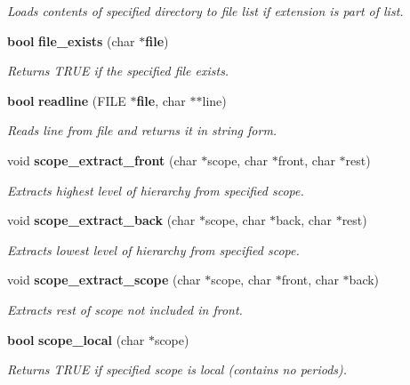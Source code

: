 \begin{CompactItemize}
\begin{CompactList}\small\item\em Loads contents of specified directory to file list if extension is part of list.\item\end{CompactList}\item 
{\bf bool} {\bf file\_\-exists} (char $\ast${\bf file})
\begin{CompactList}\small\item\em Returns TRUE if the specified file exists.\item\end{CompactList}\item 
{\bf bool} {\bf readline} (FILE $\ast${\bf file}, char $\ast$$\ast$line)
\begin{CompactList}\small\item\em Reads line from file and returns it in string form.\item\end{CompactList}\item 
void {\bf scope\_\-extract\_\-front} (char $\ast$scope, char $\ast$front, char $\ast$rest)
\begin{CompactList}\small\item\em Extracts highest level of hierarchy from specified scope.\item\end{CompactList}\item 
void {\bf scope\_\-extract\_\-back} (char $\ast$scope, char $\ast$back, char $\ast$rest)
\begin{CompactList}\small\item\em Extracts lowest level of hierarchy from specified scope.\item\end{CompactList}\item 
void {\bf scope\_\-extract\_\-scope} (char $\ast$scope, char $\ast$front, char $\ast$back)
\begin{CompactList}\small\item\em Extracts rest of scope not included in front.\item\end{CompactList}\item 
{\bf bool} {\bf scope\_\-local} (char $\ast$scope)
\begin{CompactList}\small\item\em Returns TRUE if specified scope is local (contains no periods).\item\end{CompactList}\item 
$$
\end{CompactItemize}
